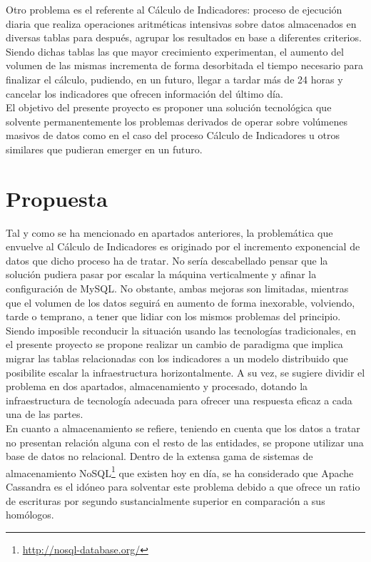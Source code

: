 Otro problema es el referente al Cálculo de Indicadores: proceso de ejecución diaria que realiza operaciones aritméticas intensivas sobre datos almacenados en diversas tablas para después, agrupar los resultados en base a diferentes criterios. Siendo dichas tablas las que mayor crecimiento experimentan, el aumento del volumen de las mismas incrementa de forma desorbitada el tiempo necesario para finalizar el cálculo, pudiendo, en un futuro, llegar a tardar más de 24 horas y cancelar los indicadores que ofrecen información del último día.\\

El objetivo del presente proyecto es proponer una solución tecnológica que solvente permanentemente los problemas derivados de operar sobre volúmenes masivos de datos como en el caso del proceso Cálculo de Indicadores u otros similares que pudieran emerger en un futuro.\\

\section{Propuesta}

Tal y como se ha mencionado en apartados anteriores, la problemática que envuelve al Cálculo de Indicadores es originado por el incremento exponencial de datos que dicho proceso ha de tratar. No sería descabellado pensar que la solución pudiera pasar por escalar la máquina verticalmente y afinar la configuración de MySQL. No obstante, ambas mejoras son limitadas, mientras que el volumen de los datos seguirá en aumento de forma inexorable, volviendo, tarde o temprano, a tener que lidiar con los mismos problemas del principio.\\

Siendo imposible reconducir la situación usando las tecnologías tradicionales, en el presente proyecto se propone realizar un cambio de paradigma que implica migrar las tablas relacionadas con los indicadores a un modelo distribuido que posibilite escalar la infraestructura horizontalmente. A su vez, se sugiere dividir el problema en dos apartados, almacenamiento y procesado, dotando la infraestructura de tecnología adecuada para ofrecer una respuesta eficaz a cada una de las partes.\\

En cuanto a almacenamiento se refiere, teniendo en cuenta que los datos a tratar no presentan relación alguna con el resto de las entidades, se propone utilizar una base de datos no relacional. Dentro de la extensa gama de sistemas de almacenamiento NoSQL\footnote{\url{http://nosql-database.org/}} que existen hoy en día, se ha considerado que Apache Cassandra\cite{lakshman2010cassandra} es el idóneo para solventar este problema debido a que ofrece un ratio de escrituras por segundo sustancialmente superior en comparación a sus homólogos\cite{rabl2012solving}.

